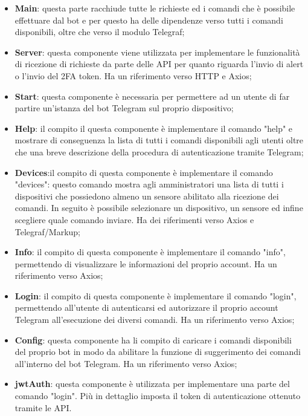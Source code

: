 	\begin{itemize}
		\item \textbf{Main}: questa parte racchiude tutte le richieste ed i comandi che è possibile effettuare dal bot e per questo ha delle dipendenze verso tutti i comandi disponibili, oltre che verso il modulo Telegraf;
		\item \textbf{Server}: questa componente viene utilizzata per implementare le funzionalità di ricezione di richieste da parte delle API per quanto riguarda l'invio di alert o l'invio del 2FA token. Ha un riferimento verso HTTP e Axios;
		\item \textbf{Start}: questa componente è necessaria per permettere ad un utente di far partire un'istanza del bot Telegram sul proprio dispositivo;
		\item \textbf{Help}: il compito il questa componente è implementare il comando "help" e mostrare di conseguenza la lista di tutti i comandi disponibili agli utenti oltre che una breve descrizione della procedura di autenticazione tramite Telegram;
		\item \textbf{Devices}:il compito di questa componente è implementare il comando "devices": questo comando mostra agli amministratori una lista di tutti i dispositivi che possiedono almeno un sensore abilitato alla ricezione dei comandi. In seguito è possibile selezionare un dispositivo, un sensore ed infine scegliere quale comando inviare. Ha dei riferimenti verso Axios e Telegraf/Markup;
		\item \textbf{Info}: il compito di questa componente è implementare il comando "info", permettendo di visualizzare le informazioni del proprio account. Ha un riferimento verso Axios; 
		\item \textbf{Login}: il compito di questa componente è implementare il comando "login", permettendo all'utente di autenticarsi ed autorizzare il proprio account Telegram all'esecuzione dei diversi comandi. Ha un riferimento verso Axios; 
		\item \textbf{Config}: questa componente ha li compito di caricare i comandi disponibili del proprio bot in modo da abilitare la funzione di suggerimento dei comandi all'interno del bot Telegram. Ha un riferimento verso Axios;
		\item \textbf{jwtAuth}: questa componente è utilizzata per implementare una parte del comando "login". Più in dettaglio imposta il token di autenticazione ottenuto tramite le API.
	\end{itemize}
